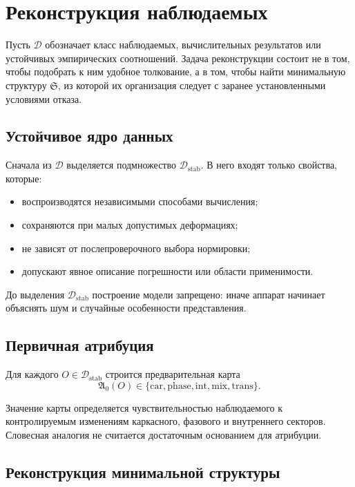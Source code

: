 \chapter{Реконструкция наблюдаемых}

Пусть $\mathcal D$ обозначает класс наблюдаемых, вычислительных результатов
или устойчивых эмпирических соотношений. Задача реконструкции состоит не в
том, чтобы подобрать к ним удобное толкование, а в том, чтобы найти
минимальную структуру $\mathfrak S$, из которой их организация следует с
заранее установленными условиями отказа.

\section{Устойчивое ядро данных}

Сначала из $\mathcal D$ выделяется подмножество $\mathcal D_{\mathrm{stab}}$.
В него входят только свойства, которые:
\begin{itemize}
 \item воспроизводятся независимыми способами вычисления;
 \item сохраняются при малых допустимых деформациях;
 \item не зависят от послепроверочного выбора нормировки;
 \item допускают явное описание погрешности или области применимости.
\end{itemize}

До выделения $\mathcal D_{\mathrm{stab}}$ построение модели запрещено: иначе
аппарат начинает объяснять шум и случайные особенности представления.

\section{Первичная атрибуция}

Для каждого $O\in\mathcal D_{\mathrm{stab}}$ строится предварительная карта
\begin{equation}
 \mathfrak A_0(O)\in
 \{\mathrm{car},\mathrm{phase},\mathrm{int},\mathrm{mix},\mathrm{trans}\}.
\end{equation}

Значение карты определяется чувствительностью наблюдаемого к контролируемым
изменениям каркасного, фазового и внутреннего секторов. Словесная аналогия не
считается достаточным основанием для атрибуции.

\section{Реконструкция минимальной структуры}

